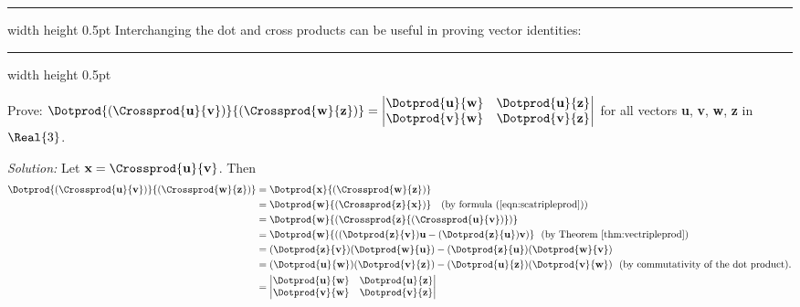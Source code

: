 \hrule width \textwidth height 0.5pt
\newpage
Interchanging the dot and cross products can be useful in proving vector identities:

\vspace{3mm}
\hrule width \textwidth height 0.5pt
\begin{exmp}\label{exmp:quadcrossdot}
 Prove: $\Dotprod{(\Crossprod{\textbf{u}}{\textbf{v}})}{(\Crossprod{\textbf{w}}{\textbf{z}})} =
 \begin{vmatrix}
   \Dotprod{\textbf{u}}{\textbf{w}} & \Dotprod{\textbf{u}}{\textbf{z}}\\
   \Dotprod{\textbf{v}}{\textbf{w}} & \Dotprod{\textbf{v}}{\textbf{z}}\end{vmatrix}$ for all vectors \textbf{u},
   \textbf{v}, \textbf{w}, \textbf{z} in $\Real{3}$.\vspace{0.5mm}
 \par\noindent\emph{Solution:} Let $\textbf{x} = \Crossprod{\textbf{u}}{\textbf{v}}$. Then
 \begin{align*}
  \Dotprod{(\Crossprod{\textbf{u}}{\textbf{v}})}{(\Crossprod{\textbf{w}}{\textbf{z}})} &=
   \Dotprod{\textbf{x}}{(\Crossprod{\textbf{w}}{\textbf{z}})}\\
  &= \Dotprod{\textbf{w}}{(\Crossprod{\textbf{z}}{\textbf{x}})} \text{~~~(by formula (\ref{eqn:scatripleprod}))}\\
  &= \Dotprod{\textbf{w}}{(\Crossprod{\textbf{z}}{(\Crossprod{\textbf{u}}{\textbf{v}})})}\\
  &= \Dotprod{\textbf{w}}{((\Dotprod{\textbf{z}}{\textbf{v}})\textbf{u} -
   (\Dotprod{\textbf{z}}{\textbf{u}})\textbf{v})} \text{~~(by Theorem \ref{thm:vectripleprod})}\\
  &= (\Dotprod{\textbf{z}}{\textbf{v}})(\Dotprod{\textbf{w}}{\textbf{u}}) -
  (\Dotprod{\textbf{z}}{\textbf{u}})(\Dotprod{\textbf{w}}{\textbf{v}})\\
  &= (\Dotprod{\textbf{u}}{\textbf{w}})(\Dotprod{\textbf{v}}{\textbf{z}}) -
  (\Dotprod{\textbf{u}}{\textbf{z}})(\Dotprod{\textbf{v}}{\textbf{w}}) \text{~~(by commutativity of the dot product).}\\
  &= \begin{vmatrix}
   \Dotprod{\textbf{u}}{\textbf{w}} & \Dotprod{\textbf{u}}{\textbf{z}}\\
   \Dotprod{\textbf{v}}{\textbf{w}} & \Dotprod{\textbf{v}}{\textbf{z}}\end{vmatrix}
 \end{align*}
\end{exmp}\vspace{-7.5mm}
